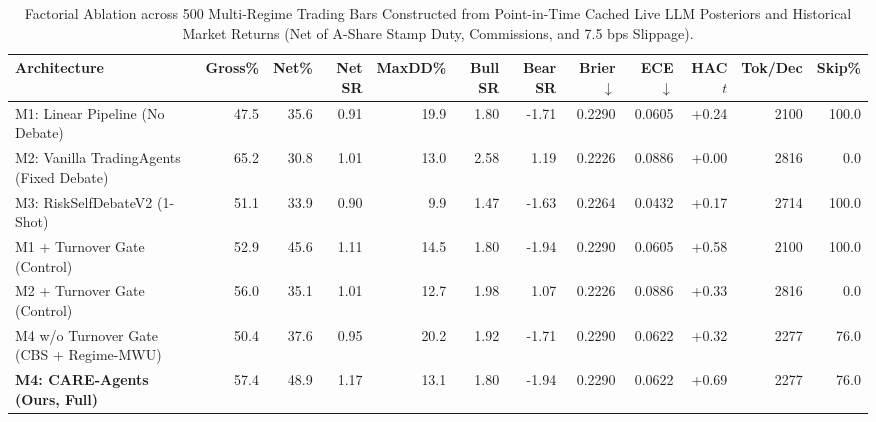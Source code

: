 \begin{table}[t]
\centering
\caption{Factorial Ablation across 500 Multi-Regime Trading Bars Constructed from Point-in-Time Cached Live LLM Posteriors and Historical Market Returns (Net of A-Share Stamp Duty, Commissions, and 7.5 bps Slippage).}
\label{tab:cph_ablation}
\begin{tabular}{lrrrrrrrrrrr}
\toprule
\textbf{Architecture} & \textbf{Gross\%} & \textbf{Net\%} & \textbf{Net SR} & \textbf{MaxDD\%} & \textbf{Bull SR} & \textbf{Bear SR} & \textbf{Brier $\downarrow$} & \textbf{ECE $\downarrow$} & \textbf{HAC $t$} & \textbf{Tok/Dec} & \textbf{Skip\%} \\
\midrule
M1: Linear Pipeline (No Debate) & 47.5 & 35.6 & 0.91 & 19.9 & 1.80 & -1.71 & 0.2290 & 0.0605 & +0.24 & 2100 & 100.0 \\
M2: Vanilla TradingAgents (Fixed Debate) & 65.2 & 30.8 & 1.01 & 13.0 & 2.58 & 1.19 & 0.2226 & 0.0886 & +0.00 & 2816 & 0.0 \\
M3: RiskSelfDebateV2 (1-Shot) & 51.1 & 33.9 & 0.90 & 9.9 & 1.47 & -1.63 & 0.2264 & 0.0432 & +0.17 & 2714 & 100.0 \\
M1 + Turnover Gate (Control) & 52.9 & 45.6 & 1.11 & 14.5 & 1.80 & -1.94 & 0.2290 & 0.0605 & +0.58 & 2100 & 100.0 \\
M2 + Turnover Gate (Control) & 56.0 & 35.1 & 1.01 & 12.7 & 1.98 & 1.07 & 0.2226 & 0.0886 & +0.33 & 2816 & 0.0 \\
M4 w/o Turnover Gate (CBS + Regime-MWU) & 50.4 & 37.6 & 0.95 & 20.2 & 1.92 & -1.71 & 0.2290 & 0.0622 & +0.32 & 2277 & 76.0 \\
\textbf{M4: CARE-Agents (Ours, Full)} & 57.4 & 48.9 & 1.17 & 13.1 & 1.80 & -1.94 & 0.2290 & 0.0622 & +0.69 & 2277 & 76.0 \\
\bottomrule
\end{tabular}
\end{table}